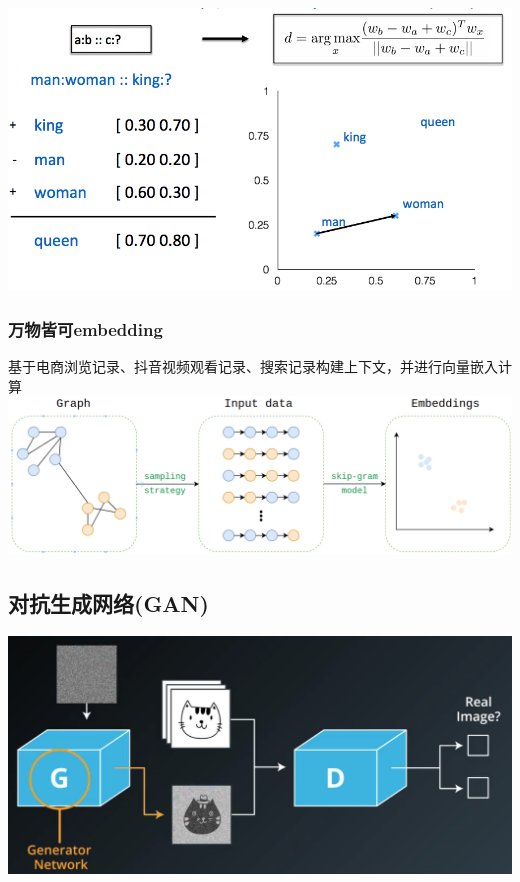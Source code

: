\documentclass[11pt]{article}
\makeatletter
\def\maxwidth{\ifdim\Gin@nat@width>\linewidth\linewidth
    \else\Gin@nat@width\fi}
\let\Oldincludegraphics\includegraphics
\renewcommand{\includegraphics}[1]{\Oldincludegraphics[width=.8\maxwidth]{#1}}
\makeatother
\begin{document}
    \includegraphics{img/wordcal.png}

    \hypertarget{ux4e07ux7269ux7686ux53efembedding}{%
\subsubsection{万物皆可embedding}\label{ux4e07ux7269ux7686ux53efembedding}}

基于电商浏览记录、抖音视频观看记录、搜索记录构建上下文，并进行向量嵌入计算
\includegraphics{img/commodityembedding.png}

    \hypertarget{ux5bf9ux6297ux751fux6210ux7f51ux7edcgan}{%
\subsection{对抗生成网络(GAN)}\label{ux5bf9ux6297ux751fux6210ux7f51ux7edcgan}}

\includegraphics{img/GAN.png}
\end{document}
